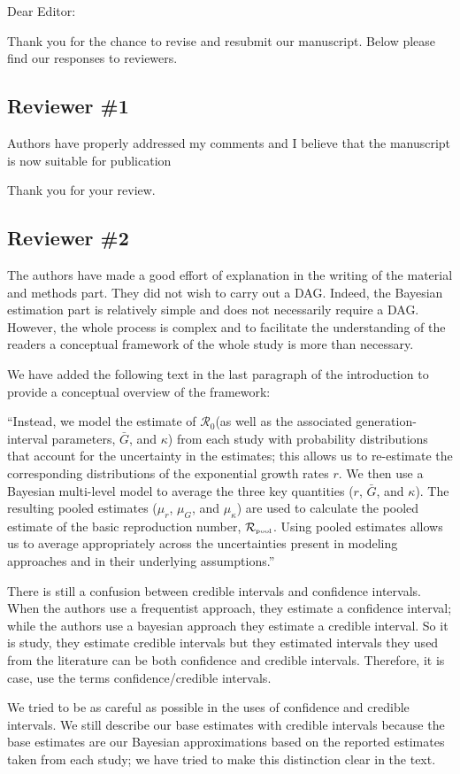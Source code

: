 \documentclass[12pt]{article}
\newcommand{\Ro}{\ensuremath{{\mathcal R}_{0}}\xspace}
\newcommand{\Rpool}{\ensuremath{{\mathcal R}_{\textrm{\tiny{pool}}}}\xspace}
\newcommand{\rev}{\subsection*}
\newcommand{\revtext}{\textsf}
\begin{document}
\noindent Dear Editor:

Thank you for the chance to revise and resubmit our manuscript.
Below please find our responses to reviewers.

\rev{Reviewer \#1}

\revtext{Authors have properly addressed my comments and I believe that the manuscript is now suitable for publication}

Thank you for your review.

\rev{Reviewer \#2}

\revtext{
The authors have made a good effort of explanation in the writing of the material and methods
part. They did not wish to carry out a DAG. Indeed, the Bayesian estimation part is relatively
simple and does not necessarily require a DAG. However, the whole process is complex and
to facilitate the understanding of the readers a conceptual framework of the whole study is
more than necessary.}

We have added the following text in the last paragraph of the introduction to provide a conceptual overview of the framework:

``Instead, we model the estimate of \Ro (as well as the associated generation-interval parameters, $\bar G$, and $\kappa$) from each study with probability distributions that account for the uncertainty in the estimates;
this allows us to re-estimate the corresponding distributions of the exponential growth rates $r$.
We then use a Bayesian multi-level model to average the three key quantities ($r$, $\bar G$, and $\kappa$).
The resulting pooled estimates ($\mu_r$, $\mu_G$, and $\mu_\kappa$) are used to calculate the pooled estimate of the basic reproduction number, \Rpool.
Using pooled estimates allows us to average appropriately across the uncertainties present in modeling approaches and in their underlying assumptions.''

\revtext{There is still a confusion between credible intervals and confidence
intervals. When the authors use a frequentist approach, they estimate a confidence interval;
while the authors use a bayesian approach they estimate a credible interval. So it is study,
they estimate credible intervals but they estimated intervals they used from the literature can
be both confidence and credible intervals. Therefore, it is case, use the terms
confidence/credible intervals.}

We tried to be as careful as possible in the uses of confidence and credible intervals.
We still describe our base estimates with credible intervals because the base estimates are our Bayesian approximations based on the reported estimates taken from each study; we have tried to make this distinction clear in the text.
\end{document}
